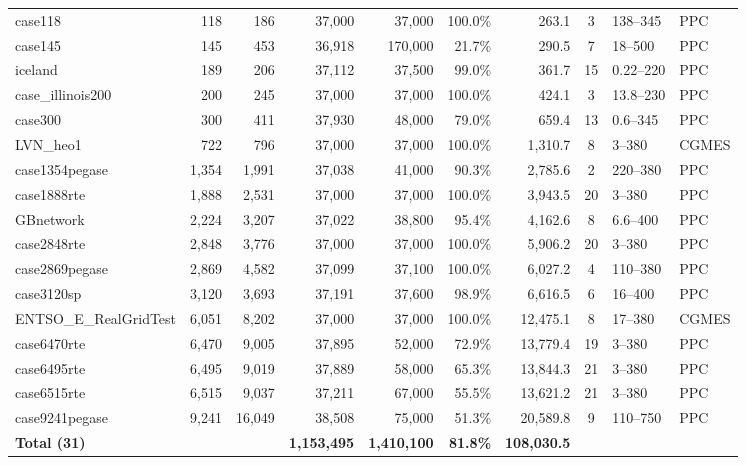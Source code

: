 \documentclass{article}
\begin{document}
{\begin{longtable}{@{}l r r r r r r c l l@{}}
case118                    & 118 & 186 & 37{,}000 & 37{,}000 & 100.0\% & 263.1 & 3 & 138--345 & PPC \\
case145                    & 145 & 453 & 36{,}918 & 170{,}000 & 21.7\% & 290.5 & 7 & 18--500 & PPC \\
iceland                    & 189 & 206 & 37{,}112 & 37{,}500 & 99.0\% & 361.7 & 15 & 0.22--220 & PPC \\
case\_illinois200          & 200 & 245 & 37{,}000 & 37{,}000 & 100.0\% & 424.1 & 3 & 13.8--230 & PPC \\
case300                    & 300 & 411 & 37{,}930 & 48{,}000 & 79.0\% & 659.4 & 13 & 0.6--345 & PPC \\
LVN\_heo1                  & 722 & 796 & 37{,}000 & 37{,}000 & 100.0\% & 1{,}310.7 & 8 & 3--380 & CGMES \\
case1354pegase             & 1{,}354 & 1{,}991 & 37{,}038 & 41{,}000 & 90.3\% & 2{,}785.6 & 2 & 220--380 & PPC \\
case1888rte                & 1{,}888 & 2{,}531 & 37{,}000 & 37{,}000 & 100.0\% & 3{,}943.5 & 20 & 3--380 & PPC \\
GBnetwork                  & 2{,}224 & 3{,}207 & 37{,}022 & 38{,}800 & 95.4\% & 4{,}162.6 & 8 & 6.6--400 & PPC \\
case2848rte                & 2{,}848 & 3{,}776 & 37{,}000 & 37{,}000 & 100.0\% & 5{,}906.2 & 20 & 3--380 & PPC \\
case2869pegase             & 2{,}869 & 4{,}582 & 37{,}099 & 37{,}100 & 100.0\% & 6{,}027.2 & 4 & 110--380 & PPC \\
case3120sp                 & 3{,}120 & 3{,}693 & 37{,}191 & 37{,}600 & 98.9\% & 6{,}616.5 & 6 & 16--400 & PPC \\
ENTSO\_E\_RealGridTest     & 6{,}051 & 8{,}202 & 37{,}000 & 37{,}000 & 100.0\% & 12{,}475.1 & 8 & 17--380 & CGMES \\
case6470rte                & 6{,}470 & 9{,}005 & 37{,}895 & 52{,}000 & 72.9\% & 13{,}779.4 & 19 & 3--380 & PPC \\
case6495rte                & 6{,}495 & 9{,}019 & 37{,}889 & 58{,}000 & 65.3\% & 13{,}844.3 & 21 & 3--380 & PPC \\
case6515rte                & 6{,}515 & 9{,}037 & 37{,}211 & 67{,}000 & 55.5\% & 13{,}621.2 & 21 & 3--380 & PPC \\
case9241pegase             & 9{,}241 & 16{,}049 & 38{,}508 & 75{,}000 & 51.3\% & 20{,}589.8 & 9 & 110--750 & PPC \\
\midrule
\textbf{Total (31)} & & & \textbf{1{,}153{,}495} & \textbf{1{,}410{,}100} & \textbf{81.8\%} & \textbf{108{,}030.5} & & & \\
\bottomrule
\end{longtable}
}
\end{document}
